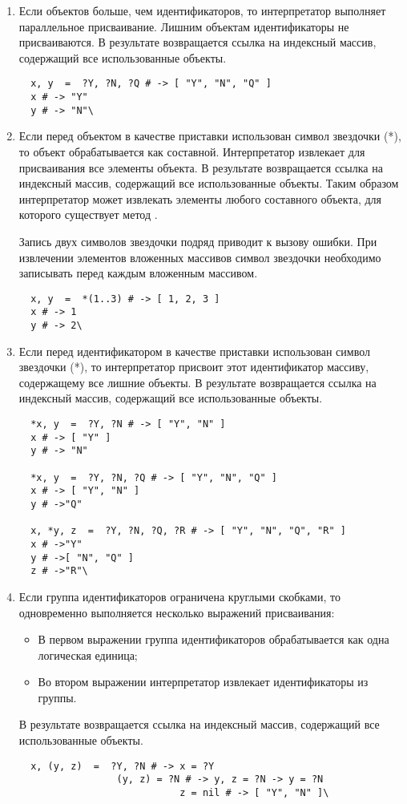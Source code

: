 \begin{enumerate}
  \item Если объектов больше, чем идентификаторов, то интерпретатор выполняет параллельное присваивание. Лишним объектам идентификаторы не присваиваются. В результате возвращается ссылка на индексный массив, содержащий все использованные объекты.
  \begin{verbatim}
  x, y  =  ?Y, ?N, ?Q # -> [ "Y", "N", "Q" ]
  x # -> "Y"
  y # -> "N"\
  \end{verbatim}

  \item Если перед объектом в качестве приставки использован символ звездочки (*), то объект обрабатывается как составной. Интерпретатор извлекает для присваивания все элементы объекта. В результате возвращается ссылка на индексный массив, содержащий все использованные объекты. Таким образом интерпретатор может извлекать элементы любого составного объекта, для которого существует метод .

  Запись двух символов звездочки подряд приводит к вызову ошибки. При извлечении элементов вложенных массивов символ звездочки необходимо записывать перед каждым вложенным массивом.
  \begin{verbatim}
  x, y  =  *(1..3) # -> [ 1, 2, 3 ]
  x # -> 1
  y # -> 2\
  \end{verbatim}

  \item Если перед идентификатором в качестве приставки использован символ звездочки (*), то интерпретатор присвоит этот идентификатор массиву, содержащему все лишние объекты. В результате возвращается ссылка на индексный массив, содержащий все использованные объекты.
  \begin{verbatim}
  *x, y  =  ?Y, ?N # -> [ "Y", "N" ]
  x # -> [ "Y" ]
  y # -> "N"

  *x, y  =  ?Y, ?N, ?Q # -> [ "Y", "N", "Q" ]
  x # -> [ "Y", "N" ]
  y # ->"Q"

  x, *y, z  =  ?Y, ?N, ?Q, ?R # -> [ "Y", "N", "Q", "R" ]
  x # ->"Y"
  y # ->[ "N", "Q" ]
  z # ->"R"\
  \end{verbatim}

  \item Если группа идентификаторов ограничена круглыми скобками, то одновременно выполняется несколько выражений присваивания:
  \begin{itemize}
    \item В первом выражении группа идентификаторов обрабатывается как одна логическая единица;
    \item Во втором выражении интерпретатор извлекает идентификаторы из группы.
  \end{itemize}

  В результате возвращается ссылка на индексный массив, содержащий все использованные объекты.
  \begin{verbatim}
  x, (y, z)  =  ?Y, ?N # -> x = ?Y
  		         (y, z) = ?N # -> y, z = ?N -> y = ?N
  						    z = nil # -> [ "Y", "N" ]\
  \end{verbatim}
\end{enumerate}